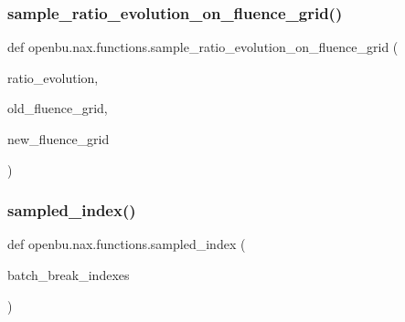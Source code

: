 \subsubsection{\texorpdfstring{sample\+\_\+ratio\+\_\+evolution\+\_\+on\+\_\+fluence\+\_\+grid()}{sample\_ratio\_evolution\_on\_fluence\_grid()}}
{\footnotesize\ttfamily def openbu.\+nax.\+functions.\+sample\+\_\+ratio\+\_\+evolution\+\_\+on\+\_\+fluence\+\_\+grid (\begin{DoxyParamCaption}\item[{}]{ratio\+\_\+evolution,  }\item[{}]{old\+\_\+fluence\+\_\+grid,  }\item[{}]{new\+\_\+fluence\+\_\+grid }\end{DoxyParamCaption})}

\mbox{\label{namespaceopenbu_1_1nax_1_1functions_a9577d985ee0b2c245730540e155fc5d6}} 
\subsubsection{\texorpdfstring{sampled\+\_\+index()}{sampled\_index()}}
{\footnotesize\ttfamily def openbu.\+nax.\+functions.\+sampled\+\_\+index (\begin{DoxyParamCaption}\item[{}]{batch\+\_\+break\+\_\+indexes }\end{DoxyParamCaption})}

